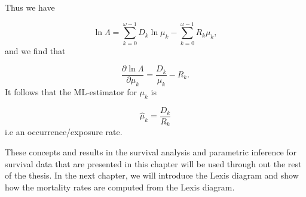 Thus we have 


\begin{equation*}
    \ln\Lambda = \sum\limits_{k=0}^{\omega -1} D_k \ln\mu_k - \sum\limits_{k=0}^{\omega -1} R_{k}\mu_k,
\end{equation*}
and we find that

\begin{equation*}
      \frac{\partial \ln \Lambda} {\partial \mu_k} = \frac{D_k}{\mu_k} - R_k.
\end{equation*}
It follows that the ML-estimator for $\mu_k$ is 

\begin{equation}
    \hat{\mu}_k = \frac{D_k}{R_k}
    \label{Mu_hat}
\end{equation}
i.e an occurrence/exposure rate.

These concepts and results in the survival analysis and parametric inference for survival data that are presented in this chapter will be used through out the rest of the thesis. 
In the next chapter, we will introduce the Lexis diagram and show how the mortality rates are computed from the Lexis diagram.  

